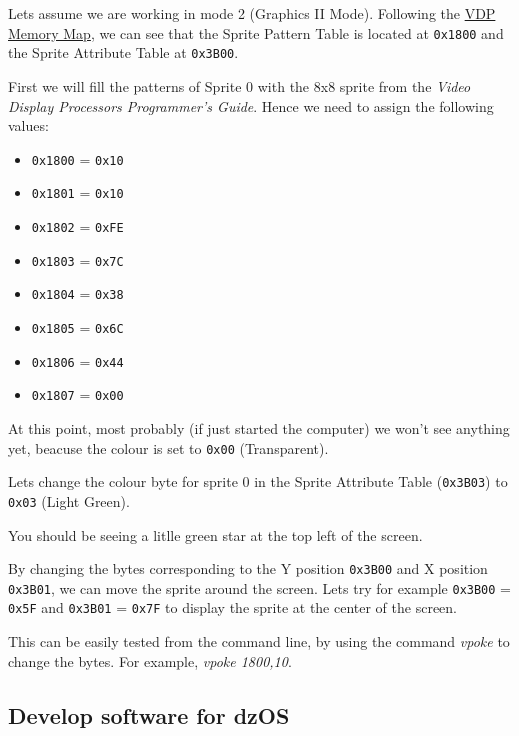         Lets assume we are working in mode 2 (Graphics II Mode). Following the
        \hyperref[subsec:vdp_memmap]{VDP Memory Map}, we can see that the Sprite
        Pattern Table is located at \texttt{0x1800} and the Sprite Attribute
        Table at \texttt{0x3B00}.

        First we will fill the patterns of Sprite 0 with the 8x8 sprite from the
        \textit{Video Display Processors Programmer's Guide}\cite{ti1}. Hence we
        need to assign the following values:

        \begin{itemize}
            \item \texttt{0x1800} = \texttt{0x10}
            \item \texttt{0x1801} = \texttt{0x10}
            \item \texttt{0x1802} = \texttt{0xFE}
            \item \texttt{0x1803} = \texttt{0x7C}
            \item \texttt{0x1804} = \texttt{0x38}
            \item \texttt{0x1805} = \texttt{0x6C}
            \item \texttt{0x1806} = \texttt{0x44}
            \item \texttt{0x1807} = \texttt{0x00}
        \end{itemize}

        At this point, most probably (if just started the computer) we won't see
        anything yet, beacuse the colour is set to \texttt{0x00} (Transparent).

        Lets change the colour byte for sprite 0 in the Sprite Attribute Table
        (\texttt{0x3B03}) to \texttt{0x03} (Light Green).

        You should be seeing a litlle green star at the top left of the screen.

        By changing the bytes corresponding to the Y position \texttt{0x3B00}
        and X position \texttt{0x3B01}, we can move the sprite around the
        screen. Lets try for example \texttt{0x3B00} = \texttt{0x5F} and
        \texttt{0x3B01} = \texttt{0x7F} to display the sprite at the center of
        the screen.

        This can be easily tested from the command line, by using the command 
        \textit{vpoke} to change the bytes. For example, \textit{vpoke 1800,10}.


    \subsection{Develop software for dzOS}

